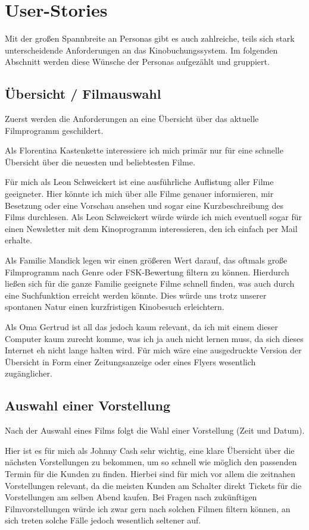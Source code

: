 \section{User-Stories}

Mit der großen Spannbreite an Personas gibt es auch zahlreiche, teils sich stark unterscheidende Anforderungen an das Kinobuchungssystem.
Im folgenden Abschnitt werden diese Wünsche der Personas aufgezählt und gruppiert.

\subsection{Übersicht / Filmauswahl}
Zuerst werden die Anforderungen an eine Übersicht über das aktuelle Filmprogramm geschildert.

Als Florentina Kastenkette interessiere ich mich primär nur für eine schnelle Übersicht über die neuesten und beliebtesten Filme.

Für mich als Leon Schweickert ist eine ausführliche Auflistung aller Filme geeigneter.
Hier könnte ich mich über alle Filme genauer informieren, mir Besetzung oder eine Vorschau ansehen und sogar eine Kurzbeschreibung des Films durchlesen.
Als Leon Schweickert würde würde ich mich eventuell sogar für einen Newsletter mit dem Kinoprogramm interessieren, den ich einfach per Mail erhalte.

Als Familie Mandick legen wir einen größeren Wert darauf, das oftmals große Filmprogramm nach Genre oder \acs{FSK}-Bewertung filtern zu können.
Hierdurch ließen sich für die ganze Familie geeignete Filme schnell finden, was auch durch eine Suchfunktion erreicht werden könnte.
Dies würde uns trotz unserer spontanen Natur einen kurzfristigen Kinobesuch erleichtern.

Als Oma Gertrud ist all das jedoch kaum relevant, da ich mit einem dieser Computer kaum zurecht komme, was ich ja auch nicht lernen muss, da sich dieses Internet eh nicht lange halten wird.
Für mich wäre eine ausgedruckte Version der Übersicht in Form einer Zeitungsanzeige oder eines Flyers wesentlich zugänglicher.

\subsection{Auswahl einer Vorstellung}
Nach der Auswahl eines Films folgt die Wahl einer Vorstellung (Zeit und Datum).

Hier ist es für mich als Johnny Cash sehr wichtig, eine klare Übersicht über die nächsten Vorstellungen zu bekommen, um so schnell wie möglich den passenden Termin für die Kunden zu finden.
Hierbei sind für mich vor allem die zeitnahen Vorstellungen relevant, da die meisten Kunden am Schalter direkt Tickets für die Vorstellungen am selben Abend kaufen.
Bei Fragen nach zukünftigen Filmvorstellungen würde ich zwar gern nach solchen Filmen filtern können, an sich treten solche Fälle jedoch wesentlich seltener auf.

